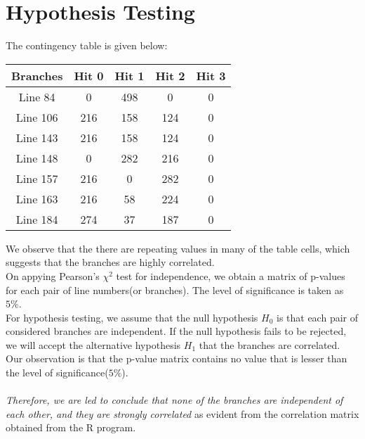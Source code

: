 \documentclass[a4paper]{article}
\begin{document}
\section{Hypothesis Testing}
The contingency table is given below:
\begin{center}
\begin{tabular}{|c|c|c|c|c|}
\hline
Branches & Hit 0 & Hit 1 & Hit 2 & Hit 3 \\
\hline
Line 84 & 0 & 498 & 0 & 0 \\
\hline
Line 106 & 216 & 158 & 124 & 0 \\
\hline
Line 143 & 216 & 158 & 124 & 0 \\
\hline
Line 148 & 0 & 282 & 216 & 0 \\
\hline
Line 157 & 216 & 0 & 282 & 0 \\
\hline
Line 163 & 216 & 58 & 224 & 0 \\
\hline
Line 184 & 274 & 37 & 187 & 0 \\
\hline
\end{tabular}
\end{center}
We observe that the there are repeating values in many of the table cells, which suggests that the branches are highly correlated.\\
On appying Pearson's $\chi^2$ test for independence, we obtain a matrix of p-values for each pair of line numbers(or branches). The level of significance is taken as $5\%$.
\\
For hypothesis testing, we assume that the null hypothesis $H_0$ is that each pair of considered branches are independent. If the null hypothesis fails to be rejected, we will accept the alternative hypothesis $H_1$ that the branches are correlated. \\Our observation is that the p-value matrix contains no value that is lesser than the level of significance($5\%$).\\\\ \textit{Therefore, we are led to conclude that none of the branches are independent of each other, and they are strongly correlated} as evident from the correlation matrix obtained from the R program.
\end{document}
